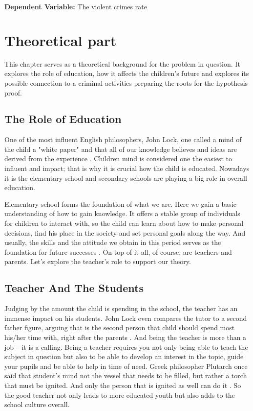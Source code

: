 \documentclass[thesis=B,english]{FITthesis}[2012/10/20]
\begin{document}
\textbf{Dependent Variable:} The violent crimes rate

\chapter{Theoretical part}

This chapter serves as a theoretical background for the problem in question. It explores the role of education, how it affects the children's future and explores its possible connection to a criminal activities preparing the roots for the hypothesis proof.

\section{The Role of Education}
One of the most influent English philosophers, John Lock, one called a mind of the child a "white paper" and that all of our knowledge believes and ideas are derived from the experience \cite{lockey2}. Children mind is considered one the easiest to influent and impact; that is why it is crucial how the child is educated. Nowadays it is the elementary school and secondary schools are playing a big role in overall education.


Elementary school forms the foundation of what we are. Here we gain a basic understanding of how to gain knowledge. It offers a stable group of individuals for children to interact with, so the child can learn about how to make personal decisions, find his place in the society and set personal goals along the way. And usually, the skills and the attitude we obtain in this period serves as the foundation for future successes \cite{education}. On top of it all, of course, are teachers and parents. Let's explore the teacher's role to support our theory.

\section{Teacher And The Students}

Judging by the amount the child is spending in the school, the teacher has an immense impact on his students.  John Lock even compares the tutor to a second father figure, arguing that is the second person that child should spend most his/her time with, right after the parents \cite{locke2013some}. And being the teacher is more than a job -- it is a calling. Being a teacher requires you not only being able to teach the subject in question but also to be able to develop an interest in the topic, guide your pupils and be able to help in time of need.  Greek philosopher Plutarch once said that student's mind not the vessel that needs to be filled, but rather a torch that must be ignited. And only the person that is ignited as well can do it \cite{pluto}. So the good teacher not only leads to more educated youth but also adds to the school culture overall.
\end{document}
